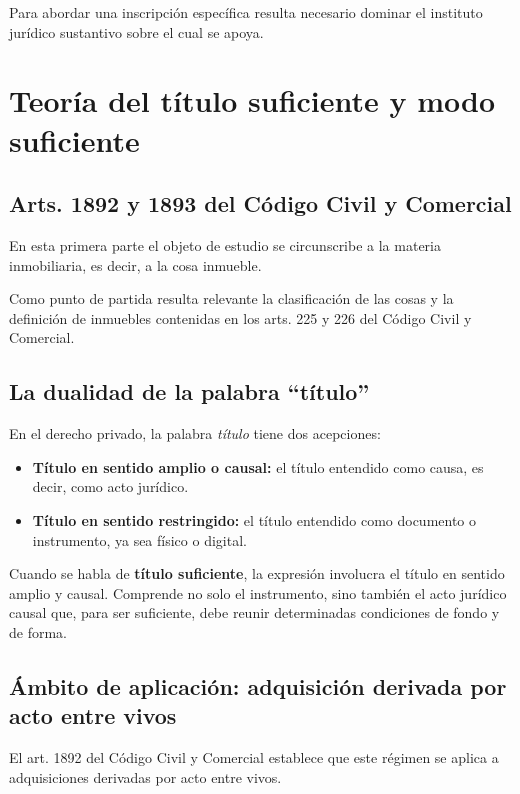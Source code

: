 \documentclass[12pt]{book}
\begin{document}
Para abordar una inscripci\'on espec\'ifica resulta necesario dominar el instituto jur\'idico sustantivo sobre el cual se apoya.

\section{Teor\'ia del t\'itulo suficiente y modo suficiente}

\subsection{Arts. 1892 y 1893 del C\'odigo Civil y Comercial}

En esta primera parte el objeto de estudio se circunscribe a la materia inmobiliaria, es decir, a la cosa inmueble.

Como punto de partida resulta relevante la clasificaci\'on de las cosas y la definici\'on de inmuebles contenidas en los arts. 225 y 226 del C\'odigo Civil y Comercial.

\subsection{La dualidad de la palabra ``t\'itulo''}

En el derecho privado, la palabra \textit{t\'itulo} tiene dos acepciones:

\begin{itemize}
    \item \textbf{T\'itulo en sentido amplio o causal:} el t\'itulo entendido como causa, es decir, como acto jur\'idico.
    \item \textbf{T\'itulo en sentido restringido:} el t\'itulo entendido como documento o instrumento, ya sea f\'isico o digital.
\end{itemize}

Cuando se habla de \textbf{t\'itulo suficiente}, la expresi\'on involucra el t\'itulo en sentido amplio y causal. Comprende no solo el instrumento, sino tambi\'en el acto jur\'idico causal que, para ser suficiente, debe reunir determinadas condiciones de fondo y de forma.

\subsection{\'Ambito de aplicaci\'on: adquisici\'on derivada por acto entre vivos}

El art. 1892 del C\'odigo Civil y Comercial establece que este r\'egimen se aplica a adquisiciones derivadas por acto entre vivos.
\end{document}
